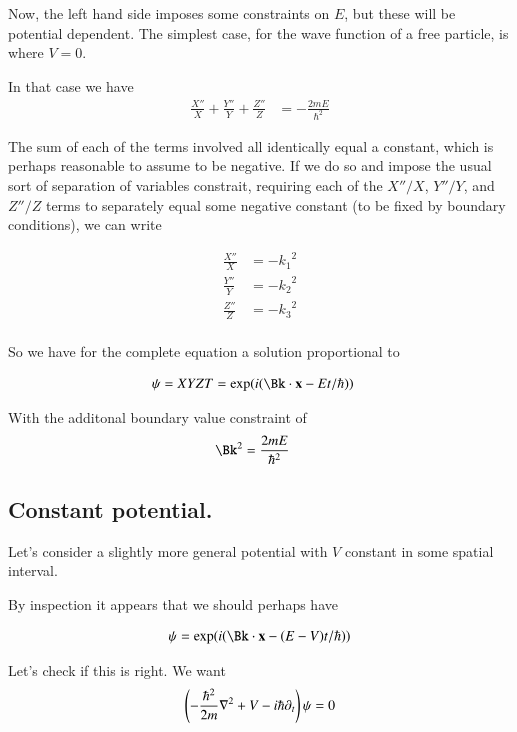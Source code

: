 \documentclass{article}
\begin{document}
Now, the left hand side imposes some constraints on $E$, but these will be potential dependent.
The simplest case, for the wave function of a free particle, is where $V=0$.

In that case we have
\begin{align*}
\frac{X''}{X} +\frac{Y''}{Y} +\frac{Z''}{Z} &= - \frac{2 m E}{\hbar^2}
\end{align*}

The sum of each of the terms involved all identically equal a constant, which is perhaps
reasonable to assume to be negative.  If we do so and impose the usual sort of separation of
variables constrait, requiring each of the $X''/X$, $Y''/Y$, and $Z''/Z$ terms to separately
equal some negative constant (to be fixed by boundary conditions), we can write

\begin{align*}
\frac{X''}{X} &= -{k_1}^2 \\
\frac{Y''}{Y} &= -{k_2}^2 \\
\frac{Z''}{Z} &= -{k_3}^2 \\
\end{align*}

So we have for the complete equation a solution proportional to

\begin{align*}
\psi = X Y Z T &= \exp(i(\Bk \cdot \Bx - E t/\hbar))
\end{align*}

With the additonal boundary value constraint of
\begin{align*}
\Bk^2 &= \frac{2 m E}{\hbar^2}
\end{align*}

\subsection{ Constant potential. }

Let's consider a slightly more general potential with $V$ constant in some spatial interval.

By inspection it appears that we should perhaps have

\begin{align*}
\psi &= \exp(i(\Bk \cdot \Bx - (E - V) t/\hbar)) \\
\end{align*}

Let's check if this is right.  We want 
\begin{align*}
\left(-\frac{\hbar^2}{2m}\nabla^2 + V -i\hbar \partial_t\right)\psi = 0
\end{align*}
\end{document}
